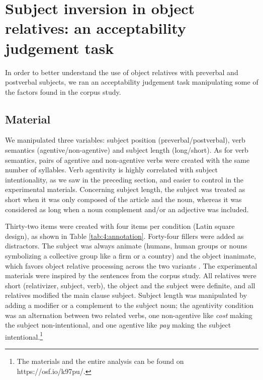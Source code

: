 \documentclass[output=paper]{langscibook}
\begin{document}
\section{Subject inversion in object relatives: an acceptability judgement task}

In order to better understand the use of object relatives with
preverbal and post\-verbal subjects, we ran an acceptability judgement
task manipulating some of the factors found in the corpus study.

\subsection{Material}


We manipulated three variables: subject position
(preverbal/postverbal), verb semantics (agentive/non-agentive) and
subject length (long/short). As for verb semantics, pairs of agentive
and non-agentive verbs were created with the same number of
syllables. Verb agentivity is highly correlated with subject
intentionality, as we saw in the preceding section, and easier to
control in the experimental materials. Concerning subject length, the
subject was treated as short when it was only composed of the article and the
noun, whereas it was considered as long when a noun complement and/or
an adjective was included.

Thirty-two items were created with four items per condition (Latin
square design), as shown in Table \ref{tab:4:annotation}. Forty-four
fillers were added as distractors. The subject was always animate
(humans, human groups or nouns symbolizing a collective group like a
firm or a country) and the object inanimate, which favors object
relative processing across the two variants \citep{Frauenfelder1980,
  mak2006animacy}. The experimental materials were inspired by the
sentences from the corpus study. All relatives were short
(relativizer, subject, verb), the object and the subject were
definite, and all relatives modified the main clause subject. Subject
length was manipulated by adding a modifier or a complement to the
subject noun; the agentivity condition was an alternation between two
related verbs, one non-agentive like {\textit{cost}} making the
subject non-intentional, and one agentive like \textit{pay} making the
subject intentional.\footnote{The materials and the entire analysis
  can be found on https://osf.io/k97pu/.}
\end{document}
